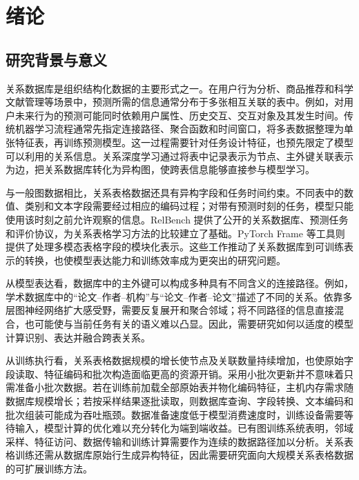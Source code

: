
\chapter{绪论}
\label{chap:introduction}

\section{研究背景与意义}

关系数据库是组织结构化数据的主要形式之一。在用户行为分析、商品推荐和科学文献管理等场景中，预测所需的信息通常分布于多张相互关联的表中。例如，对用户未来行为的预测可能同时依赖用户属性、历史交互、交互对象及其发生时间。传统机器学习流程通常先指定连接路径、聚合函数和时间窗口，将多表数据整理为单张特征表，再训练预测模型。这一过程需要针对任务设计特征，也预先限定了模型可以利用的关系信息。关系深度学习通过将表中记录表示为节点、主外键关联表示为边，把关系数据库转化为异构图，使跨表信息能够直接参与模型学习\cite{fey2024rdl}。

与一般图数据相比，关系表格数据还具有异构字段和任务时间约束。不同表中的数值、类别和文本字段需要经过相应的编码过程；对带有预测时刻的任务，模型只能使用该时刻之前允许观察的信息。RelBench 提供了公开的关系数据库、预测任务和评价协议，为关系表格学习方法的比较建立了基础\cite{robinson2024relbench}。PyTorch Frame 等工具则提供了处理多模态表格字段的模块化表示\cite{hu2024pytorchframe}。这些工作推动了关系数据库到可训练表示的转换，也使模型表达能力和训练效率成为更突出的研究问题。

从模型表达看，数据库中的主外键可以构成多种具有不同含义的连接路径。例如，学术数据库中的“论文--作者--机构”与“论文--作者--论文”描述了不同的关系。依靠多层图神经网络扩大感受野，需要反复展开和聚合邻域；将不同路径的信息直接混合，也可能使与当前任务有关的语义难以凸显。因此，需要研究如何以适度的模型计算识别、表达并融合跨表关系。

从训练执行看，关系表格数据规模的增长使节点及关联数量持续增加，也使原始字段读取、特征编码和批次构造面临更高的资源开销。采用小批次更新并不意味着只需准备小批次数据。若在训练前加载全部原始表并物化编码特征，主机内存需求随数据库规模增长；若按采样结果逐批读取，则数据库查询、字段转换、文本编码和批次组装可能成为吞吐瓶颈。数据准备速度低于模型消费速度时，训练设备需要等待输入，模型计算的优化难以充分转化为端到端收益。已有图训练系统表明，邻域采样、特征访问、数据传输和训练计算需要作为连续的数据路径加以分析\cite{kaler2022salient,liu2023bgl}。关系表格训练还需从数据库原始行生成异构特征，因此需要研究面向大规模关系表格数据的可扩展训练方法。

